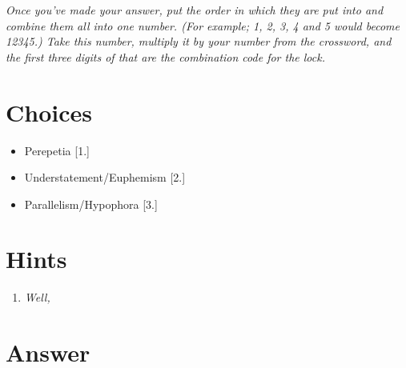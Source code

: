 \documentclass[11pt]{article}
\begin{document}
\newpage

\textit{Once you've made your answer, put the order in which they are put into and combine them all into one number. (For example; 1, 2, 3, 4 and 5 would become 12345.) Take this number, multiply it by your number from the crossword, and the first three digits of that are the combination code for the lock.}

\section*{Choices}

\begin{itemize}
  \item Perepetia [1.]
  \item Understatement/Euphemism [2.]
  \item Parallelism/Hypophora [3.]
\end{itemize}

\newpage

\section*{Hints}

\begin{enumerate}
  \item \textit{Well, }
\end{enumerate}

\section*{Answer}
\end{document}
